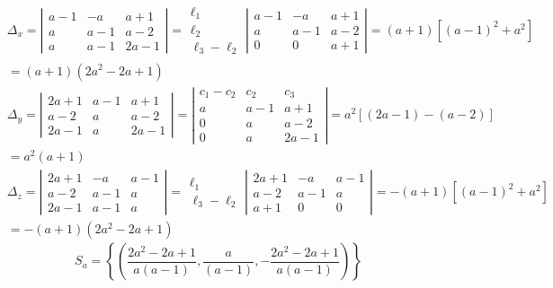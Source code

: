 {\begin{enumerate}
{$$
\begin{aligned}
& \Delta_x=\left|\begin{array}{ccc}
a-1 & -a & a+1 \\
a & a-1 & a-2 \\
a & a-1 & 2 a-1
\end{array}\right|=\begin{array}{c}
\ell_1 \\
\ell_2 \\
\ell_3-\ell_2
\end{array}\left|\begin{array}{ccc}
a-1 & -a & a+1 \\
a & a-1 & a-2 \\
0 & 0 & a+1
\end{array}\right|=(a+1)\left[(a-1)^2+a^2\right] \\
& =(a+1)\left(2 a^2-2 a+1\right) \\
& \Delta_y=\left|\begin{array}{ccc}
2 a+1 & a-1 & a+1 \\
a-2 & a & a-2 \\
2 a-1 & a & 2 a-1
\end{array}\right|=\left|\begin{array}{ccc}
c_1-c_2 & c_2 & c_3 \\
a & a-1 & a+1 \\
0 & a & a-2 \\
0 & a & 2 a-1
\end{array}\right|=a^2[(2 a-1)-(a-2)] \\
& =a^2(a+1) \\
& \Delta_z=\left|\begin{array}{ccc}
2 a+1 & -a & a-1 \\
a-2 & a-1 & a \\
2 a-1 & a-1 & a
\end{array}\right|=\begin{array}{c}
\ell_1 \\
\ell_3-\ell_2
\end{array}\left|\begin{array}{ccc}
2 a+1 & -a & a-1 \\
a-2 & a-1 & a \\
a+1 & 0 & 0
\end{array}\right|=-(a+1)\left[(a-1)^2+a^2\right] \\
& =-(a+1)\left(2 a^2-2 a+1\right)
\end{aligned}
$$
$$S_a=\left\{\left(\frac{2 a^2-2 a+1}{a(a-1)}, \frac{a}{(a-1)},-\frac{2 a^2-2 a+1}{a(a-1)}\right)\right\}$$ }

\end{enumerate}}
